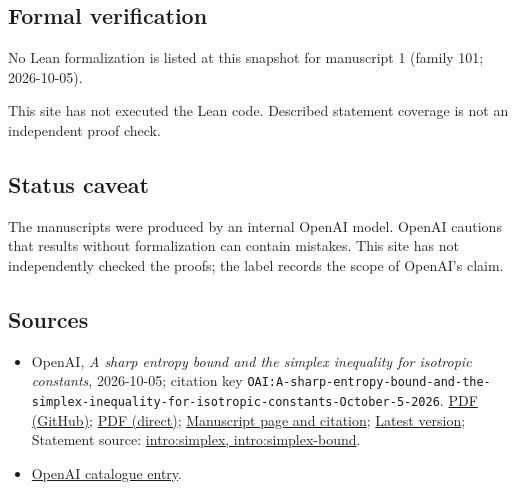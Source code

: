 \documentclass[11pt]{article}
\begin{document}
\subsection{Formal verification}
No Lean formalization is listed at this snapshot for manuscript 1 (family 101; 2026-10-05).

This site has not executed the Lean code. Described statement coverage is not an independent proof check.

\subsection{Status caveat}
The manuscripts were produced by an internal OpenAI model. OpenAI cautions that results without formalization can contain mistakes. This site has not independently checked the proofs; the label records the scope of OpenAI's claim.

\subsection{Sources}
\begin{itemize}
\item OpenAI, \emph{A sharp entropy bound and the simplex inequality for isotropic constants}, 2026-10-05; citation key \texttt{OAI:A-sharp-entropy-bound-and-the-simplex-inequality-for-isotropic-constants-October-5-2026}. \href{https://github.com/openai/math/blob/adc7f1241b42e322a6451854ab7e4b4c146bf78a/preprints/A-sharp-entropy-bound-and-the-simplex-inequality-for-isotropic-constants-October-5-2026/isotropic-simplex.pdf}{PDF (GitHub)}; \href{https://github.com/openai/math/raw/adc7f1241b42e322a6451854ab7e4b4c146bf78a/preprints/A-sharp-entropy-bound-and-the-simplex-inequality-for-isotropic-constants-October-5-2026/isotropic-simplex.pdf}{PDF (direct)}; \href{https://github.com/openai/math/blob/adc7f1241b42e322a6451854ab7e4b4c146bf78a/preprints/A-sharp-entropy-bound-and-the-simplex-inequality-for-isotropic-constants-October-5-2026/README.md}{Manuscript page and citation}; \href{https://github.com/openai/math/blob/main/preprints/A-sharp-entropy-bound-and-the-simplex-inequality-for-isotropic-constants-October-5-2026/isotropic-simplex.pdf}{Latest version}; Statement source: \href{https://github.com/openai/math/blob/adc7f1241b42e322a6451854ab7e4b4c146bf78a/preprints/A-sharp-entropy-bound-and-the-simplex-inequality-for-isotropic-constants-October-5-2026/build/manuscript/introduction.tex\#L39}{intro:simplex, intro:simplex-bound}.
\item \href{https://github.com/openai/math/blob/adc7f1241b42e322a6451854ab7e4b4c146bf78a/CONTENTS.md}{OpenAI catalogue entry}.
\end{itemize}
\end{document}
